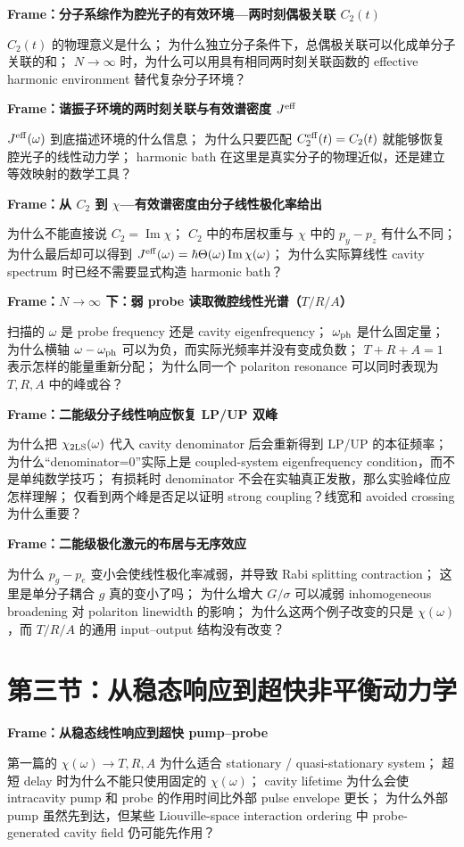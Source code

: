 \documentclass[11pt]{ctexart}
\newcommand{\framecue}[1]{%
  \par\smallskip
  \noindent\textbf{#1}\quad
}
\begin{document}
\framecue{Frame：分子系综作为腔光子的有效环境---两时刻偶极关联 \(C_2(t)\)}
\(C_2(t)\) 的物理意义是什么；
为什么独立分子条件下，总偶极关联可以化成单分子关联的和；
\(N\rightarrow\infty\) 时，为什么可以用具有相同两时刻关联函数的 effective harmonic environment 替代复杂分子环境？

\framecue{Frame：谐振子环境的两时刻关联与有效谱密度 \(J^{\rm eff}\)}
\(J^{\rm eff}(\omega)\) 到底描述环境的什么信息；
为什么只要匹配 \(C_2^{\rm eff}(t)=C_2(t)\) 就能够恢复腔光子的线性动力学；
harmonic bath 在这里是真实分子的物理近似，还是建立等效映射的数学工具？

\framecue{Frame：从 \(C_2\) 到 \(\chi\)---有效谱密度由分子线性极化率给出}
为什么不能直接说 \(C_2=\operatorname{Im}\chi\)；
\(C_2\) 中的布居权重与 \(\chi\) 中的 \(p_y-p_z\) 有什么不同；
为什么最后却可以得到 \(J^{\rm eff}(\omega)=\hbar\Theta(\omega)\operatorname{Im}\chi(\omega)\)；
为什么实际算线性 cavity spectrum 时已经不需要显式构造 harmonic bath？

\framecue{Frame：\(N\to\infty\) 下：弱 probe 读取微腔线性光谱（\(T/R/A\)）}
扫描的 \(\omega\) 是 probe frequency 还是 cavity eigenfrequency；
\(\omega_{\rm ph}\) 是什么固定量；
为什么横轴 \(\omega-\omega_{\rm ph}\) 可以为负，而实际光频率并没有变成负数；
\(T+R+A=1\) 表示怎样的能量重新分配；
为什么同一个 polariton resonance 可以同时表现为 \(T,R,A\) 中的峰或谷？

\framecue{Frame：二能级分子线性响应恢复 LP/UP 双峰}
为什么把 \(\chi_{\rm 2LS}(\omega)\) 代入 cavity denominator 后会重新得到 LP/UP 的本征频率；
为什么``denominator=0''实际上是 coupled-system eigenfrequency condition，而不是单纯数学技巧；
有损耗时 denominator 不会在实轴真正发散，那么实验峰位应怎样理解；
仅看到两个峰是否足以证明 strong coupling？线宽和 avoided crossing 为什么重要？

\framecue{Frame：二能级极化激元的布居与无序效应}
为什么 \(p_g-p_e\) 变小会使线性极化率减弱，并导致 Rabi splitting contraction；
这里是单分子耦合 \(g\) 真的变小了吗；
为什么增大 \(G/\sigma\) 可以减弱 inhomogeneous broadening 对 polariton linewidth 的影响；
为什么这两个例子改变的只是 \(\chi(\omega)\)，而 \(T/R/A\) 的通用 input--output 结构没有改变？

\section*{第三节：从稳态响应到超快非平衡动力学}

\framecue{Frame：从稳态线性响应到超快 pump--probe}
第一篇的 \(\chi(\omega)\rightarrow T,R,A\) 为什么适合 stationary / quasi-stationary system；
超短 delay 时为什么不能只使用固定的 \(\chi(\omega)\)；
cavity lifetime 为什么会使 intracavity pump 和 probe 的作用时间比外部 pulse envelope 更长；
为什么外部 pump 虽然先到达，但某些 Liouville-space interaction ordering 中 probe-generated cavity field 仍可能先作用？
\end{document}
